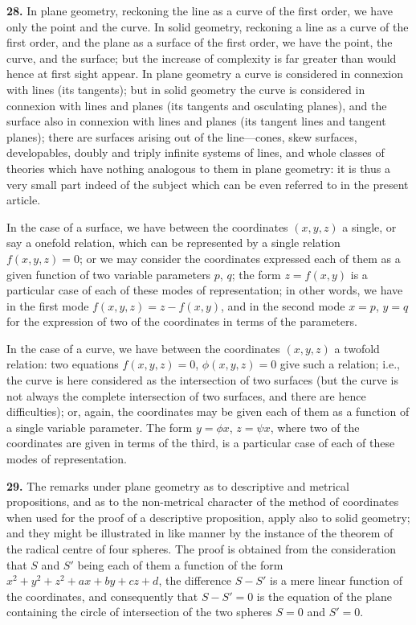 \documentclass[11pt,a4paper]{article}
\theoremstyle{definition}
\begin{document}
\textbf{28.} In plane geometry, reckoning the line as a curve of the first order, we have only the point and the curve. In solid geometry, reckoning a line as a curve of the first order, and the plane as a surface of the first order, we have the point, the curve, and the surface; but the increase of complexity is far greater than would hence at first sight appear. In plane geometry a curve is considered in connexion with lines (its tangents); but in solid geometry the curve is considered in connexion with lines and planes (its tangents and osculating planes), and the surface also in connexion with lines and planes (its tangent lines and tangent planes); there are surfaces arising out of the line---cones, skew surfaces, developables, doubly and triply infinite systems of lines, and whole classes of theories which have nothing analogous to them in plane geometry: it is thus a very small part indeed of the subject which can be even referred to in the present article.

In the case of a surface, we have between the coordinates $(x,y,z)$ a single, or say a onefold relation, which can be represented by a single relation $f(x,y,z)=0$; or we may consider the coordinates expressed each of them as a given function of two variable parameters $p$, $q$; the form $z=f(x,y)$ is a particular case of each of these modes of representation; in other words, we have in the first mode $f(x,y,z)=z-f(x,y)$, and in the second mode $x=p$, $y=q$ for the expression of two of the coordinates in terms of the parameters.

In the case of a curve, we have between the coordinates $(x,y,z)$ a twofold relation: two equations $f(x,y,z)=0$, $\phi(x,y,z)=0$ give such a relation; i.e., the curve is here considered as the intersection of two surfaces (but the curve is not always the complete intersection of two surfaces, and there are hence difficulties); or, again, the coordinates may be given each of them as a function of a single variable parameter. The form $y=\phi x$, $z=\psi x$, where two of the coordinates are given in terms of the third, is a particular case of each of these modes of representation.

\textbf{29.} The remarks under plane geometry as to descriptive and metrical propositions, and as to the non-metrical character of the method of coordinates when used for the proof of a descriptive proposition, apply also to solid geometry; and they might be illustrated in like manner by the instance of the theorem of the radical centre of four spheres. The proof is obtained from the consideration that $S$ and $S'$ being each of them a function of the form $x^2+y^2+z^2+ax+by+cz+d$, the difference $S-S'$ is a mere linear function of the coordinates, and consequently that $S-S'=0$ is the equation of the plane containing the circle of intersection of the two spheres $S=0$ and $S'=0$.
\end{document}

